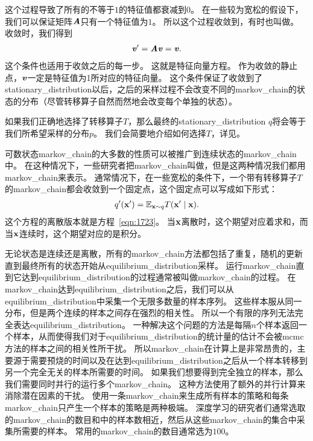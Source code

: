 这个过程导致了所有的不等于$1$的特征值都衰减到$0$。
在一些较为宽松的假设下，我们可以保证矩阵$\boldsymbol{\mathit{A}}$只有一个特征值为$1$。
所以这个过程收敛到，有时也叫做。
收敛时，我们得到
\begin{align}
\label{eqn:1723}
\boldsymbol{\mathit{v}} ' = \boldsymbol{\mathit{A}} \boldsymbol{\mathit{v}} = \boldsymbol{\mathit{v}} .
\end{align}
这个条件也适用于收敛之后的每一步。
这就是特征向量方程。
作为收敛的静止点，$\boldsymbol{\mathit{v}}$一定是特征值为1所对应的特征向量。
这个条件保证了收敛到了\gls{stationary_distribution}以后，之后的采样过程不会改变不同的\gls{markov_chain}的状态的分布（尽管转移算子自然而然地会改变每个单独的状态）。

如果我们正确地选择了转移算子$T$，那么最终的\gls{stationary_distribution} $q$将会等于我们所希望采样的分布$p$。
我们会简要地介绍如何选择$T$，详见。


可数状态\gls{markov_chain}的大多数的性质可以被推广到连续状态的\gls{markov_chain}中。
在这种情况下，一些研究者把\gls{markov_chain}叫做，但是这两种情况我们都用\gls{markov_chain}来表示。
通常情况下，在一些宽松的条件下，一个带有转移算子$T$的\gls{markov_chain}都会收敛到一个固定点，这个固定点可以写成如下形式：
\begin{align}
q' (\mathbf{x}') = \mathbb{E}_{\mathbf{x}\sim q}T(\mathbf{x}'\mid \mathbf{x}).
\end{align}
这个方程的离散版本就是方程~\eqref{eqn:1723}。	
当$\mathbf{x}$离散时，这个期望对应着求和，而当$\mathbf{x}$连续时，这个期望对应的是积分。



无论状态是连续还是离散，所有的\gls{markov_chain}方法都包括了重复，随机的更新直到最终所有的状态开始从\gls{equilibrium_distribution}采样。
运行\gls{markov_chain}直到它达到\gls{equilibrium_distribution}的过程通常被叫做\gls{markov_chain}的过程。
在\gls{markov_chain}达到\gls{equilibrium_distribution}之后，我们可以从\gls{equilibrium_distribution}中采集一个无限多数量的样本序列。
这些样本服从同一分布，但是两个连续的样本之间存在强烈的相关性。
所以一个有限的序列无法完全表达\gls{equilibrium_distribution}。
一种解决这个问题的方法是每隔$n$个样本返回一个样本，从而使得我们对于\gls{equilibrium_distribution}的统计量的估计不会被\gls{mcmc}方法的样本之间的相关性所干扰。
所以\gls{markov_chain}在计算上是非常昂贵的，主要源于需要预烧的时间以及在达到\gls{equilibrium_distribution}之后从一个样本转移到另一个完全无关的样本所需要的时间。
如果我们想要得到完全独立的样本，那么我们需要同时并行的运行多个\gls{markov_chain}。
这种方法使用了额外的并行计算来消除潜在因素的干扰。
使用一条\gls{markov_chain}来生成所有样本的策略和每条\gls{markov_chain}只产生一个样本的策略是两种极端。
深度学习的研究者们通常选取的\gls{markov_chain}的数目和中的样本数相近，然后从这些\gls{markov_chain}的集合中采集所需要的样本。
常用的\gls{markov_chain}的数目通常选为$100$。

